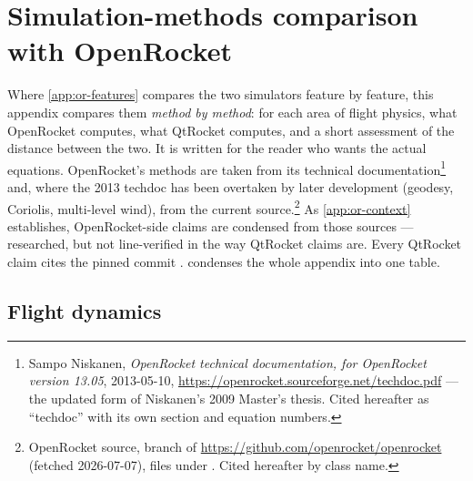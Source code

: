 \section{Simulation-methods comparison with OpenRocket}\label{app:or-methods}

Where \cref{app:or-features} compares the two simulators feature by feature, this appendix
compares them \emph{method by method}: for each area of flight physics, what OpenRocket
computes, what QtRocket computes, and a short assessment of the distance between the two.
It is written for the reader who wants the actual equations. OpenRocket's methods are taken
from its technical documentation\footnote{Sampo Niskanen, \emph{OpenRocket technical
documentation, for OpenRocket version 13.05}, 2013-05-10,
\url{https://openrocket.sourceforge.net/techdoc.pdf} --- the updated form of Niskanen's 2009
Master's thesis. Cited hereafter as ``techdoc'' with its own section and equation numbers.}
and, where the 2013 techdoc has been overtaken by later development (geodesy, Coriolis,
multi-level wind), from the current source.\footnote{OpenRocket source, 
branch of \url{https://github.com/openrocket/openrocket} (fetched 2026-07-07), files under
. Cited hereafter by class name.}
As \cref{app:or-context} establishes, OpenRocket-side claims are condensed from those
sources --- researched, but not line-verified in the way QtRocket claims are. Every QtRocket
claim cites the pinned commit .  condenses the
whole appendix into one table.

\subsection{Flight dynamics}\label{app:or-methods-dynamics}

